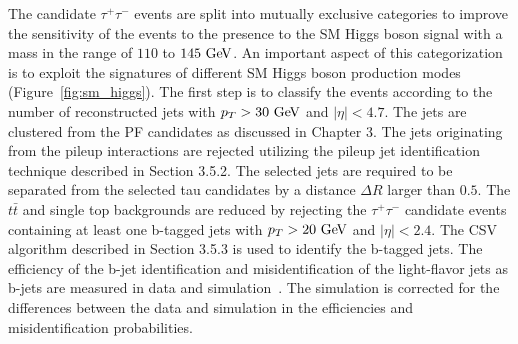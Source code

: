 The candidate $\tau^{+}\tau^{-}$  events are split into mutually exclusive categories to improve the sensitivity of the events to the presence to the SM Higgs boson signal with a mass in the range of $110$ to $145~\mathrm{Ge\kern -0.1em V}$. An important aspect of this categorization is to exploit the signatures of different SM Higgs boson production modes (Figure~\ref{fig:sm_higgs}). The first step is to classify the events according to the number of reconstructed jets with $p_{T}>30~\mathrm{Ge\kern -0.1em V}$ and $|\eta|<4.7$. The jets are clustered from the PF candidates as discussed in Chapter 3. The jets originating from the pileup interactions are rejected utilizing the pileup jet identification technique described in Section 3.5.2. The selected jets are  required to be separated from the selected tau candidates by a distance $\Delta R$ larger than $0.5$. The $t\bar{t}$ and single top backgrounds are reduced by rejecting the $\tau^{+}\tau^{-}$ candidate events containing at least one b-tagged jets with $p_{T}>20~\mathrm{Ge\kern -0.1em V}$ and $|\eta|<2.4$. The CSV algorithm described in Section 3.5.3 is used to identify the b-tagged jets. The efficiency of the b-jet identification and misidentification of the light-flavor jets as b-jets are measured in data and simulation~\cite{Chatrchyan:2012jua}. The simulation is corrected for the differences between the data and simulation in the efficiencies and misidentification probabilities.

